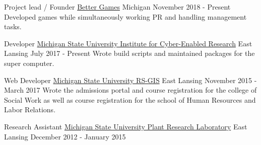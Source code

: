 
\begin{cventries}
  \cventry
    {Project lead / Founder} %
    {\href{https://www.better-games.org}{Better Games}} %
    {Michigan} %
    {November 2018 - Present} %
    {
        {Developed games while simultaneously working PR and handling management tasks.}
    }

  \cventry
    {Developer}
    {\href{https://icer.msu.edu}{Michigan State University Institute for Cyber-Enabled Research}}
    {East Lansing}
    {July 2017 - Present}
    {
        {Wrote build scripts and maintained packages for the super computer.}
    }

  \cventry
    {Web Developer}
    {\href{http://www.rsgis.msu.edu}{Michigan State University RS-GIS}}
    {East Lansing}
    {November 2015 - March 2017}
    {
      {Wrote the admissions portal and course registration for the college of Social Work as well as
      course registration for the school of Human Resources and Labor Relations.}
    }

  \cventry
    {Research Assistant}
    {\href{https://prl.natsci.msu.edu/research-tech/center-for-advanced-algal-and-plant-phenotyping}{Michigan State University Plant Research Laboratory}}
    {East Lansing}
    {December 2012 - January 2015}
    {
    }
\end{cventries}
